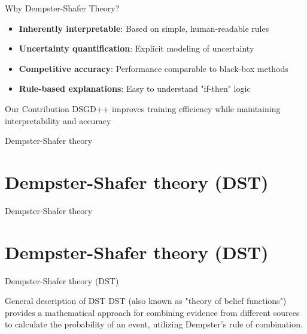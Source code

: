 \documentclass[aspectratio=169]{beamer}
\begin{document}
\begin{frame}{Why Dempster-Shafer Theory?}
    \begin{itemize}
        \item \textbf{Inherently interpretable}: Based on simple, human-readable rules
        \item \textbf{Uncertainty quantification}: Explicit modeling of uncertainty
        \item \textbf{Competitive accuracy}: Performance comparable to black-box methods
        \item \textbf{Rule-based explanations}: Easy to understand "if-then" logic
    \end{itemize}
    
    \pause
    \vspace{1em}
    \begin{block}{Our Contribution}
        DSGD++ improves training efficiency while maintaining interpretability and accuracy
    \end{block}
\end{frame}

\begin{frame}
    \begin{center}
        \Huge Dempster-Shafer theory
    \end{center}
\end{frame}

\section{Dempster-Shafer theory (DST)} 

\begin{frame}
    \begin{center}
        \Huge Dempster-Shafer theory
    \end{center}
\end{frame}

\section{Dempster-Shafer theory (DST)}
\begin{frame}{Dempster-Shafer theory (DST)}
    \begin{block}{General description of DST}
        DST (also known as "theory of belief functions") provides a
mathematical approach for combining evidence from different sources to calculate
the probability of an event, utilizing Dempster's rule of combination. 
        
    \end{block}
\end{frame}
\end{document}
